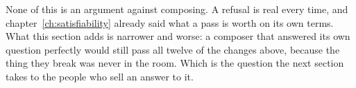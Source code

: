 %
None of this is an argument against composing. A refusal is real every time,
and chapter~\ref{ch:satisfiability} already said what a pass is worth on its
own terms. What this section adds is narrower and worse: a composer that
answered its own question perfectly would still pass all twelve of the changes
above, because the thing they break was never in the room. Which is the
question the next section takes to the people who sell an answer to it.
%
